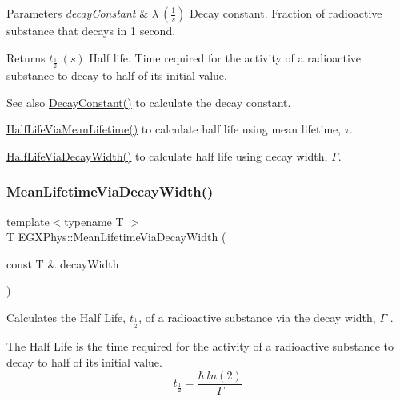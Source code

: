 \begin{DoxyParams}{Parameters}
{\em decay\+Constant} & $\lambda\ (\frac{1}{s})$ Decay constant. Fraction of radioactive substance that decays in 1 second. \\
\hline
\end{DoxyParams}
\begin{DoxyReturn}{Returns}
$t_{\frac{1}{2}}\ (s)$ Half life. Time required for the activity of a radioactive substance to decay to half of its initial value. 
\end{DoxyReturn}
\begin{DoxySeeAlso}{See also}
\hyperlink{group___e_g_x_phys-_decay_constant_ga904edce5aad441b4a0873b3b1a83c7f2}{Decay\+Constant()} to calculate the decay constant. 

\hyperlink{group___e_g_x_phys-_half_life_gacddef16b62e98b214ec8dd8af7da7dce}{Half\+Life\+Via\+Mean\+Lifetime()} to calculate half life using mean lifetime, $\tau$. 

\hyperlink{group___e_g_x_phys-_half_life_gaba3fda944d1a68ee1016a1f2f5809359}{Half\+Life\+Via\+Decay\+Width()} to calculate half life using decay width, $\Gamma$. 
\end{DoxySeeAlso}
\mbox{\label{group___e_g_x_phys-_mean_lifetime_ga8a1dda4168b4b25db93bf1ae7832fd7e}} 
\subsubsection{\texorpdfstring{Mean\+Lifetime\+Via\+Decay\+Width()}{MeanLifetimeViaDecayWidth()}}
{\footnotesize\ttfamily template$<$typename T $>$ \\
T E\+G\+X\+Phys\+::\+Mean\+Lifetime\+Via\+Decay\+Width (\begin{DoxyParamCaption}\item[{const T \&}]{decay\+Width }\end{DoxyParamCaption})}



Calculates the Half Life, $t_{\frac{1}{2}}$, of a radioactive substance via the decay width, $\Gamma$ . 

The Half Life is the time required for the activity of a radioactive substance to decay to half of its initial value. \[t_{\frac{1}{2}}=\frac{\hbar \ ln(2)}{\Gamma}\]

